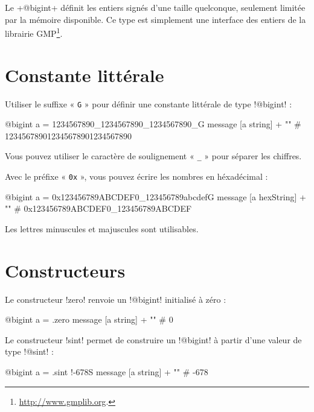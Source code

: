 

Le \ggs+@bigint+ définit les entiers signés d'une taille quelconque, seulement limitée par la mémoire disponible. Ce type est simplement une interface des entiers de la librairie GMP\footnote{\url{http://www.gmplib.org}.}.

\section{Constante littérale}

Utiliser le suffixe « \texttt{G} » pour définir une constante littérale de type \ggs!@bigint! :
\begin{galgas}
@bigint a = 1234567890_1234567890_1234567890_G
message [a string] + "\n" # 123456789012345678901234567890
\end{galgas}

Vous pouvez utiliser le caractère de soulignement « \texttt{\_} » pour séparer les chiffres.

Avec le préfixe « \texttt{0x} », vous pouvez écrire les nombres en héxadécimal :
\begin{galgas}
@bigint a = 0x123456789ABCDEF0_123456789abcdefG
message [a hexString] + "\n" # 0x123456789ABCDEF0_123456789ABCDEF
\end{galgas}

Les lettres minuscules et majuscules sont utilisables.

\section{Constructeurs}


Le constructeur \ggs!zero! renvoie un \ggs!@bigint! initialisé à zéro :
\begin{galgas}
@bigint a = .zero
message [a string] + "\n" # 0
\end{galgas}



Le constructeur \ggs!sint! permet de construire un \ggs!@bigint! à partir d'une valeur de type \ggs!@sint! :
\begin{galgas}
@bigint a = .sint {!-678S}
message [a string] + "\n" # -678
\end{galgas}



